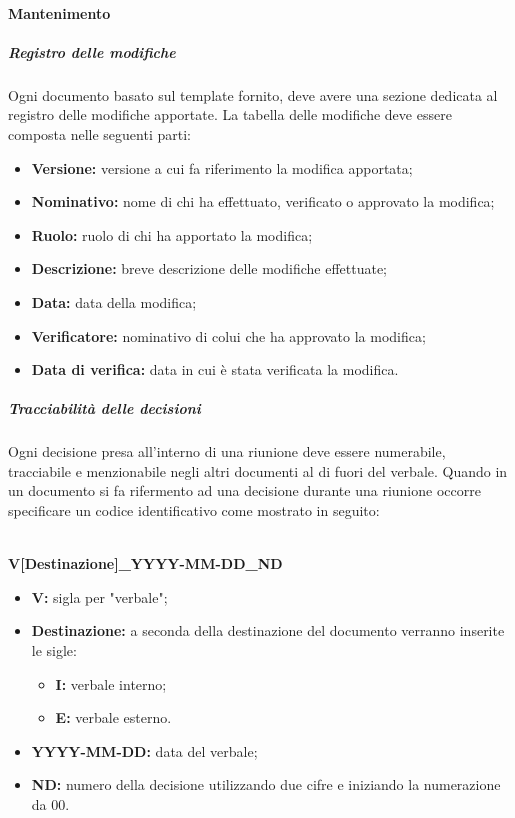   \paragraph{Mantenimento}
	  \subparagraph*{Registro delle modifiche}
	  Ogni documento basato sul template fornito, deve avere una sezione dedicata al registro delle modifiche apportate.
	  La tabella delle modifiche deve essere composta nelle seguenti parti:
	  \begin{itemize}
	  	\item \textbf{Versione:} versione a cui fa riferimento la modifica apportata;
	  	\item \textbf{Nominativo:} nome di chi ha effettuato, verificato o approvato la modifica;
	  	\item \textbf{Ruolo:} ruolo di chi ha apportato la modifica;
	  	\item \textbf{Descrizione:} breve descrizione delle modifiche effettuate;
	  	\item \textbf{Data:} data della modifica;
	  	\item \textbf{Verificatore:} nominativo di colui che ha approvato la modifica;
	  	\item \textbf{Data di verifica:} data in cui è stata verificata la modifica.
	  \end{itemize}

    \subparagraph*{Tracciabilità delle decisioni}
      Ogni decisione presa all'interno di una riunione deve essere numerabile, tracciabile e menzionabile negli altri documenti al di fuori del verbale. Quando in un documento si fa rifermento ad una decisione durante una riunione
      occorre specificare un codice identificativo come mostrato in seguito:\\\\
      \centerline{\textbf{V[Destinazione]\_YYYY-MM-DD\_ND}} 
      \begin{itemize}
      	\item \textbf{V:} sigla per "verbale";
      	\item \textbf{Destinazione:} a seconda della destinazione del documento verranno inserite le sigle:
      	\begin{itemize}
      		\item \textbf{I:} verbale interno;
      		\item \textbf{E:} verbale esterno.
      	\end{itemize}
      	\item \textbf{YYYY-MM-DD:} data del verbale;
      	\item \textbf{ND:} numero della decisione utilizzando due cifre e iniziando la numerazione da 00.
      \end{itemize}
  
  
  	

